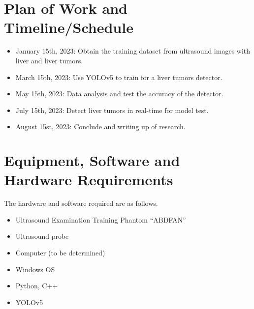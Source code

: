 \documentclass[12pt, a4paper]{article}
\begin{document}
\section{Plan of Work and Timeline/Schedule}

\begin{itemize}
  \item January 15th, 2023: Obtain the training dataset from ultrasound images with liver and liver tumors.
  \item March 15th, 2023: Use YOLOv5 to train for a liver tumors detector. 
  \item May 15th, 2023: Data analysis and test the accuracy of the detector.
  \item July 15th, 2023: Detect liver tumors in real-time for model test.
  \item August 15st, 2023: Conclude and writing up of research.
\end{itemize}


\section{Equipment, Software and Hardware Requirements}


The hardware and software required are as follows.
\begin{itemize}
\item Ultrasound Examination Training Phantom “ABDFAN”
\item Ultrasound probe
\item Computer (to be determined)
\item Windows OS
\item Python, C++
\item YOLOv5
\end{itemize}
\end{document}
